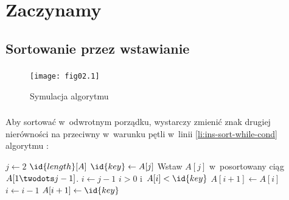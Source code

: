 \chapter{Zaczynamy}

\section{Sortowanie przez wstawianie}

\subsection{} %
\begin{figure}[h]
	\begin{center}
		\texttt{[image: fig02.1]}
	\end{center}
	\caption{Symulacja algorytmu }
\end{figure}

\subsection{} %
Aby sortować w~odwrotnym porządku, wystarczy zmienić znak drugiej nierówności na przeciwny w~warunku pętli  w~linii \ref{li:ins-sort-while-cond} algorytmu :
\begin{codebox}
\li	\For $j\gets 2$ \To $\id{length}[A]$
\li		\Do
			$\id{key}\gets A[j]$
\li			\Comment Wstaw $A[j]$ w~posortowany ciąg $A[1\twodots j-1]$.
\li			$i\gets j-1$
\li			\While $i>0$ i~$A[i]<\id{key}$ \label{li:ins-sort-while-cond}
\li				\Do
					$A[i+1]\gets A[i]$
\li					$i\gets i-1$
				\End
\li			$A[i+1]\gets \id{key}$
		\End
\end{codebox}

